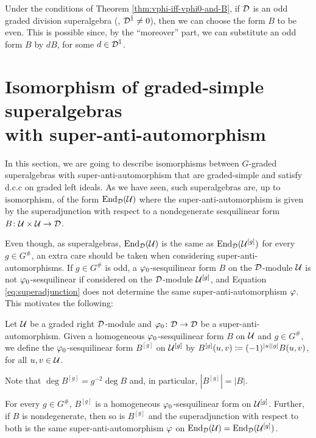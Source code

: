 \begin{remark}\label{conv:pick-even-form}
    Under the conditions of Theorem \ref{thm:vphi-iff-vphi0-and-B}, if $\mathcal{D}$ is an odd graded division superalgebra (\ie, $\mathcal{D}^{\bar1} \neq 0$), then we can choose the form $B$ to be even. 
    This is possible since, by the ``moreover'' part, we can substitute an odd form $B$ by $dB$, for some $d\in \mathcal{D}^{\bar1}$.
\end{remark}

\section{Isomorphism of graded-simple superalgebras\\ with super-anti-automorphism}\label{sec:iso-vphi-abstract}

In this section, we are going to describe isomorphisms between $G$-graded superalgebras with super-anti-automorphism that are graded-simple and satisfy d.c.c on graded left ideals. 
As we have seen, such superalgebras are, up to isomorphism, of the form $\operatorname{End}_{\mathcal{D}} (\mathcal U)$ where the super-anti-automorphism is given by the superadjunction with respect to a nondegenerate sesquilinear form $B\colon \mathcal U \times \mathcal U \to \mathcal{D}$.

Even though, as superalgebras, $\operatorname{End}_{\mathcal{D}}( \mathcal U )$ is the same as $\operatorname{End}_{\mathcal{D}}( \mathcal U^{[g]} )$ for every $g \in G^\#$, an extra care should be taken when considering super-anti-automorphisms. 
If $g\in G^\#$ is odd, a $\varphi_0$-sesquilinear form $B$ on the $\mathcal{D}$-module $\mathcal U$ is not $\varphi_0$-sesquilinear if considered on the $\mathcal{D}$-module $\mathcal U^{[g]}$, and Equation \eqref{eq:superadjunction} does not determine the same super-anti-automorphism $\varphi$. 
This motivates the following:

\begin{defi}
    Let $\mathcal U$ be a graded right $\mathcal{D}$-module and $\varphi_0\colon \mathcal{D} \to \mathcal{D}$ be a super-anti-automorphism. 
    Given a homogeneous $\varphi_0$-sesquilinear form $B$ on $\mathcal U$ and $g\in G^\#$, we define the $\varphi_0$-sesquilinear form  $B^{[g]}$ on $\mathcal U^{[g]}$ by $B^{[g]}(u,v) \coloneqq (-1)^{|u||g|} B(u,v)$, for all $u,v \in \mathcal U$. 
\end{defi}

\begin{remark}\label{rmk:deg-B^[g]}
    Note that $\deg B^{[g]} = g^{-2} \deg B$ and, in particular, $|B^{[g]}| = |B|$.
\end{remark}

\begin{lemma}\label{lemma:B^[b]-does-the-job}
    For every $g\in G^\#$, $B^{[g]}$ is a homogeneous $\varphi_0$-sesquilinear form on $\mathcal U^{[g]}$. 
    Further, if $B$ is nondegenerate, then so is $B^{[g]}$ and the superadjunction with respect to both is the same super-anti-automorphism $\varphi$ on $\operatorname{End}_{\mathcal{D}}(\mathcal U) = \operatorname{End}_{\mathcal{D}}(\mathcal U^{[g]})$.
\end{lemma}

